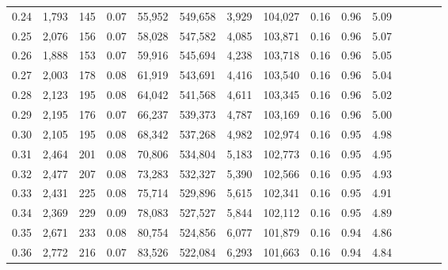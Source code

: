 \begin{tabular}{rrrcrrrrrrrrrrr}
0.24 &   1,793 &    145 &                                       0.07 &   55,952 &  549,658 &    3,929 &  104,027 &  0.16 &  0.96 &                         5.09 \\
0.25 &   2,076 &    156 &                                       0.07 &   58,028 &  547,582 &    4,085 &  103,871 &  0.16 &  0.96 &                         5.07 \\
0.26 &   1,888 &    153 &                                       0.07 &   59,916 &  545,694 &    4,238 &  103,718 &  0.16 &  0.96 &                         5.05 \\
0.27 &   2,003 &    178 &                                       0.08 &   61,919 &  543,691 &    4,416 &  103,540 &  0.16 &  0.96 &                         5.04 \\
0.28 &   2,123 &    195 &                                       0.08 &   64,042 &  541,568 &    4,611 &  103,345 &  0.16 &  0.96 &                         5.02 \\
0.29 &   2,195 &    176 &                                       0.07 &   66,237 &  539,373 &    4,787 &  103,169 &  0.16 &  0.96 &                         5.00 \\
0.30 &   2,105 &    195 &                                       0.08 &   68,342 &  537,268 &    4,982 &  102,974 &  0.16 &  0.95 &                         4.98 \\
0.31 &   2,464 &    201 &                                       0.08 &   70,806 &  534,804 &    5,183 &  102,773 &  0.16 &  0.95 &                         4.95 \\
0.32 &   2,477 &    207 &                                       0.08 &   73,283 &  532,327 &    5,390 &  102,566 &  0.16 &  0.95 &                         4.93 \\
0.33 &   2,431 &    225 &                                       0.08 &   75,714 &  529,896 &    5,615 &  102,341 &  0.16 &  0.95 &                         4.91 \\
0.34 &   2,369 &    229 &                                       0.09 &   78,083 &  527,527 &    5,844 &  102,112 &  0.16 &  0.95 &                         4.89 \\
0.35 &   2,671 &    233 &                                       0.08 &   80,754 &  524,856 &    6,077 &  101,879 &  0.16 &  0.94 &                         4.86 \\
0.36 &   2,772 &    216 &                                       0.07 &   83,526 &  522,084 &    6,293 &  101,663 &  0.16 &  0.94 &                         4.84 \\

\end{tabular}
